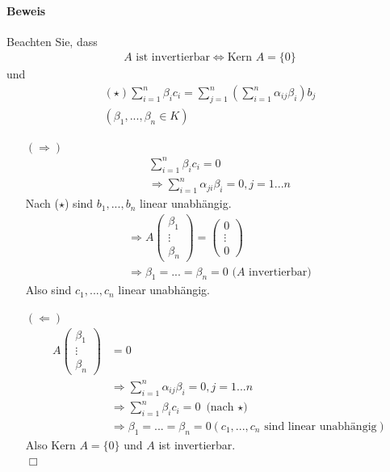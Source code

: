 \documentclass[11pt]{report}
\begin{document}
\paragraph{Beweis}
Beachten Sie, dass
\begin{align}
A \text{ ist invertierbar} \Leftrightarrow \text{Kern } A = \{0\}
\end{align}
und 
\begin{align}
(\star) \sum_{i=1}^{n} \beta_i c_i = \sum_{j=1}^{n} \left( \sum_{i=1}^{n} \alpha_{ij} \beta_i \right) b_j \\
(\beta_1, ..., \beta_n \in K)
\end{align}
\begin{itemize}
\item[$(\Rightarrow)$] 
\begin{align}
\sum_{i=1}^{n} \beta_i c_i = 0 \\
\Rightarrow \sum_{i=1}^{n} \alpha_{ji} \beta_i = 0, j=1...n
\end{align}
Nach ($\star$) sind $b_{1}, ..., b_{n}$ linear unabhängig.
\begin{align}
\Rightarrow A \begin{pmatrix} \beta_1 \\ \vdots \\ \beta_n \end{pmatrix} = \begin{pmatrix} 0 \\ \vdots \\ 0\end{pmatrix} \\
\Rightarrow \beta_1 = ... = \beta_n = 0 \text{ ($A$ invertierbar)}
\end{align}
Also sind $c_1, ..., c_n$ linear unabhängig.
\item[$(\Leftarrow)$]
\begin{align}
A \begin{pmatrix} \beta_1 \\ \vdots \\ \beta_n \end{pmatrix} &= 0 \\
&\Rightarrow \sum_{i=1}^{n} \alpha_{ij} \beta_i = 0, j=1...n \\
&\Rightarrow \sum_{i=1}^{n} \beta_i c_i = 0 \text{ (nach $\star$)} \\
&\Rightarrow \beta_1 = ... = \beta_n = 0 (c_1, ..., c_n \text{ sind linear unabhängig})
\end{align}
Also Kern $A = \{0\}$ und $A$ ist invertierbar.\\
\hspace*{1cm}\hfill $\Box$
\end{itemize}
\end{document}
